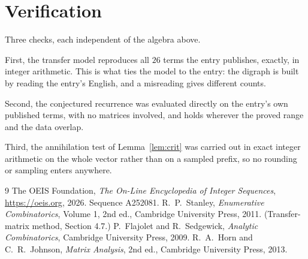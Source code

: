 \documentclass[11pt,a4paper]{article}
\theoremstyle{plain}
\theoremstyle{definition}
\begin{document}
\section{Verification}

Three checks, each independent of the algebra above.

First, the transfer model reproduces all $26$ terms the entry publishes, exactly, in
integer arithmetic. This is what ties the model to the entry: the digraph is built by reading
the entry's English, and a misreading gives different counts.

Second, the conjectured recurrence was evaluated directly on the entry's own published terms,
with no matrices involved, and holds wherever the proved range and the data overlap.

Third, the annihilation test of Lemma~\ref{lem:crit} was carried out in exact integer
arithmetic on the whole vector rather than on a sampled prefix, so no rounding or sampling
enters anywhere.

\begin{thebibliography}{9}
 The OEIS Foundation, \emph{The On-Line Encyclopedia of Integer
Sequences}, \url{https://oeis.org}, 2026. Sequence A252081.
 R.~P.~Stanley, \emph{Enumerative Combinatorics}, Volume 1, 2nd ed.,
Cambridge University Press, 2011. (Transfer-matrix method, Section 4.7.)
 P.~Flajolet and R.~Sedgewick, \emph{Analytic Combinatorics}, Cambridge
University Press, 2009.
 R.~A.~Horn and C.~R.~Johnson, \emph{Matrix Analysis}, 2nd ed., Cambridge
University Press, 2013.
\end{thebibliography}
\end{document}

